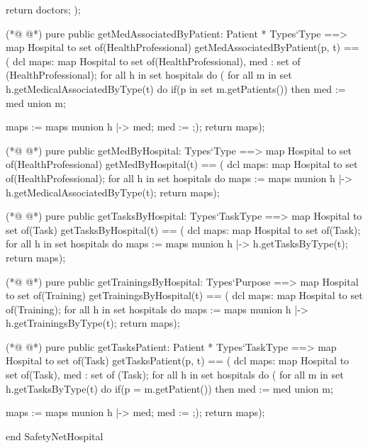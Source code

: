 \begin{vdmpp}[breaklines=true]
                  return doctors;
                 );
                               
(*@
\label{getMedAssociatedByPatient:53}
@*)
 pure public getMedAssociatedByPatient: Patient * Types`Type ==> map Hospital to set of(HealthProfessional)
  getMedAssociatedByPatient(p, t) == (
                     dcl maps: map Hospital to set of(HealthProfessional), med : set of (HealthProfessional);
                     for all h in set hospitals do (
                      for all m in set h.getMedicalAssociatedByType(t) do
                       if(p in set m.getPatients())
                        then med := med union {m};
                       
                      maps := maps munion {h |-> med};
                      med := {};);
                      return maps);
 
(*@
\label{getMedByHospital:65}
@*)
 pure public getMedByHospital: Types`Type ==> map Hospital to set of(HealthProfessional)
  getMedByHospital(t) == (
                     dcl maps: map Hospital to set of(HealthProfessional);
                     for all h in set hospitals do
                      maps := maps munion {h |-> h.getMedicalAssociatedByType(t)};
                     return maps);
                     
(*@
\label{getTasksByHospital:72}
@*)
 pure public getTasksByHospital: Types`TaskType ==> map Hospital to set of(Task)
  getTasksByHospital(t) == (
                     dcl maps: map Hospital to set of(Task);
                     for all h in set hospitals do
                      maps := maps munion {h |-> h.getTasksByType(t)};
                     return maps);
                     
(*@
\label{getTrainingsByHospital:79}
@*)
 pure public getTrainingsByHospital: Types`Purpose ==> map Hospital to set of(Training)
  getTrainingsByHospital(t) == (
                     dcl maps: map Hospital to set of(Training);
                     for all h in set hospitals do
                      maps := maps munion {h |-> h.getTrainingsByType(t)};
                     return maps);
                     
(*@
\label{getTasksPatient:86}
@*)
 pure public getTasksPatient: Patient * Types`TaskType ==> map Hospital to set of(Task)
  getTasksPatient(p, t) == (
                     dcl maps: map Hospital to set of(Task), med : set of (Task);
                     for all h in set hospitals do (
                      for all m in set h.getTasksByType(t) do
                       if(p = m.getPatient())
                        then med := med union {m};
                       
                      maps := maps munion {h |-> med};
                      med := {};);
                      return maps);
                     
  
end SafetyNetHospital
\end{vdmpp}
